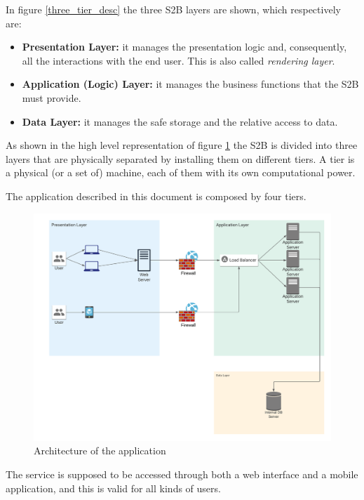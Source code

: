 \documentclass[table, 12pt]{article}
\begin{document}
In figure \ref{three_tier_desc} the three S2B layers are shown, which respectively are:
\begin{itemize}
    \item \textbf{Presentation Layer:} it manages the presentation logic and, consequently, all the interactions with the end user. This is also called \textit{rendering layer}.
    \item \textbf{Application (Logic) Layer:} it manages the business functions that the S2B must provide.
    \item \textbf{Data Layer:} it manages the safe storage and the relative access to data.
\end{itemize}

As shown in the high level representation of figure \ref{three_tier_application} the S2B is divided into three layers that are physically separated by installing them on different tiers. A tier is a physical (or a set of) machine, each of them with its own computational power.

The application described in this document is composed by four tiers.

\begin{figure}[H]
    \includegraphics[width=\textwidth]{assets/Architectural-Design/ApplicationArchitecture.png}
    \caption{Architecture of the application}
    \label{three_tier_application}
\end{figure}

The service is supposed to be accessed through both a web interface and a mobile application, and this is valid for all kinds of users.
\end{document}
